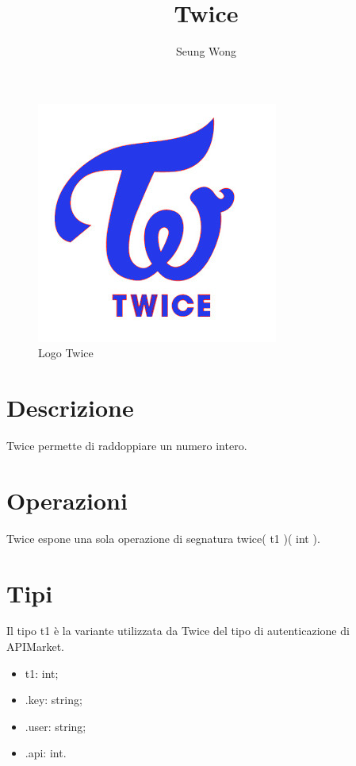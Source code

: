 \documentclass[a4paper]{article}
\title{Twice}
\author{Seung Wong}
\begin{document}
\maketitle

\begin{figure}[H]
	\centering
	\includegraphics[width=0.3\linewidth]{Twice.jpg}
	\caption{Logo Twice}
\end{figure}

\section{Descrizione}

Twice permette di raddoppiare un numero intero.

\section{Operazioni}

Twice espone una sola operazione di segnatura twice( t1 )( int ).

\section{Tipi}

Il tipo t1 è la variante utilizzata da Twice del tipo di autenticazione di APIMarket.
\begin{itemize}
	\item t1: int;
	\item .key: string;
	\item .user: string;
	\item .api: int.
\end{itemize}
\end{document}
